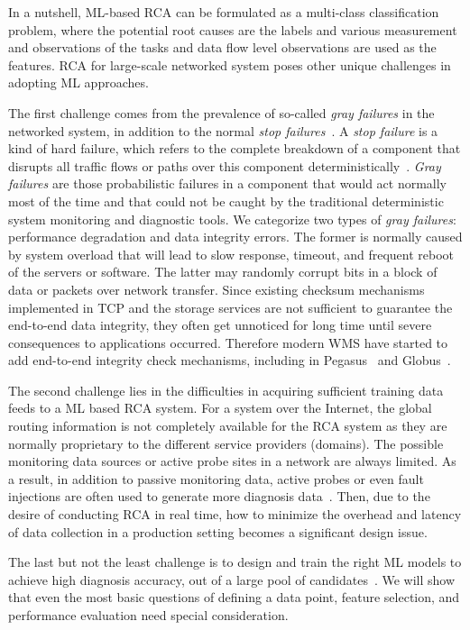 In a nutshell, ML-based RCA can be formulated as a multi-class classification problem, where the potential root causes are the labels and various 
measurement and observations of the tasks and data flow level observations are used as the features.
RCA for large-scale networked system poses other unique challenges in adopting ML approaches.
 
The first challenge comes from the prevalence of so-called {\it gray failures} in the networked system, in addition to the normal {\it stop failures}~\cite{GrayFailure:2017,DeepView:NSDI18}. A {\it stop failure} is a kind of hard failure, which refers to the complete breakdown of a component that disrupts all traffic flows or paths over this component deterministically~\cite{Link-JIoT-2019}. {\it Gray failures} are those probabilistic failures in a component that would act normally most of the time and that could not be caught by the traditional deterministic system monitoring and diagnostic tools. We categorize two types of  {\it gray failures}: performance degradation and data integrity errors. The former is normally caused by system overload that will lead to slow response, timeout, and frequent reboot of the servers or software. The latter may randomly corrupt bits in a block of data or packets over network transfer. Since existing checksum mechanisms implemented in TCP and the storage services are not sufficient to guarantee the end-to-end data integrity, they often get unnoticed for long time until severe consequences to applications occurred. Therefore modern WMS have started to add end-to-end integrity check mechanisms, including in Pegasus~\cite{swip:pearc:2019} and Globus~\cite{IntegrityVerification:DataTransfer}.

The second challenge lies in the difficulties in acquiring sufficient training data feeds to a ML based RCA system. For a system over the Internet, the global routing information is not completely available for the RCA system as they are normally proprietary to the different service providers (domains). The possible monitoring data sources or active probe sites in a network are always limited. As a result, in addition to passive monitoring data, active probes or even fault injections are often used to generate more diagnosis data~\cite{active:iot:2019, NetPoirot:Sigcomm2016}. Then, due to the desire of conducting RCA in real time, how to minimize the overhead and latency of data collection in a production setting becomes a significant design issue.

The last but not the least challenge is to design and train the right ML models to achieve high diagnosis accuracy, out of a large pool of candidates~\cite{Boutaba:2018aa}. We will show that even the most basic questions of defining a data point, feature selection, and performance evaluation need special consideration.

